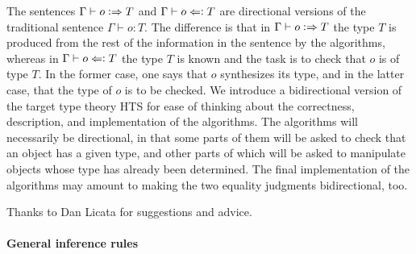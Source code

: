 \documentclass[11pt]{article}
\newcommand{\synth}{\vcentcolon\Rightarrow}
\newcommand{\force}{\Leftarrow\vcentcolon}
\begin{document}
The sentences $\Gamma\vdash o \synth T$ and $\Gamma\vdash o \force T$ are
directional versions of the traditional sentence $\Gamma\vdash o : T$.  The
difference is that in $\Gamma\vdash o \synth T$ the type $T$ is produced from
the rest of the information in the sentence by the algorithms, whereas in
$\Gamma\vdash o \force T$ the type $T$ is known and the task is to check that
$o$ is of type $T$.  In the former case, one says that $o$ synthesizes its
type, and in the latter case, that the type of $o$ is to be checked.  We
introduce a bidirectional version of the target type theory HTS for ease of
thinking about the correctness, description, and implementation of the
algorithms.  The algorithms will necessarily be directional, in that some parts
of them will be asked to check that an object has a given type, and other parts
of which will be asked to manipulate objects whose type has already been
determined.  The final implementation of the algorithms may amount to making
the two equality judgments bidirectional, too.

Thanks to Dan Licata for suggestions and advice.

\paragraph{General inference rules} 
\end{document}
